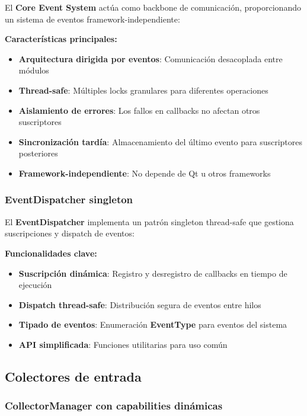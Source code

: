 El \textbf{Core Event System} actúa como backbone de comunicación, proporcionando un sistema de eventos framework-independiente:

\textbf{Características principales:}
\begin{itemize}
    \item \textbf{Arquitectura dirigida por eventos}: Comunicación desacoplada entre módulos
    \item \textbf{Thread-safe}: Múltiples locks granulares para diferentes operaciones
    \item \textbf{Aislamiento de errores}: Los fallos en callbacks no afectan otros suscriptores
    \item \textbf{Sincronización tardía}: Almacenamiento del último evento para suscriptores posteriores
    \item \textbf{Framework-independiente}: No depende de Qt u otros frameworks
\end{itemize}

\subsubsection{EventDispatcher singleton}

El \textbf{EventDispatcher} implementa un patrón singleton thread-safe que gestiona suscripciones y dispatch de eventos:

\textbf{Funcionalidades clave:}
\begin{itemize}
    \item \textbf{Suscripción dinámica}: Registro y desregistro de callbacks en tiempo de ejecución
    \item \textbf{Dispatch thread-safe}: Distribución segura de eventos entre hilos
    \item \textbf{Tipado de eventos}: Enumeración \textbf{EventType} para eventos del sistema
    \item \textbf{API simplificada}: Funciones utilitarias para uso común
\end{itemize}

\subsection{Colectores de entrada}
\label{subsec:colectores_entrada}

\subsubsection{CollectorManager con capabilities dinámicas}

